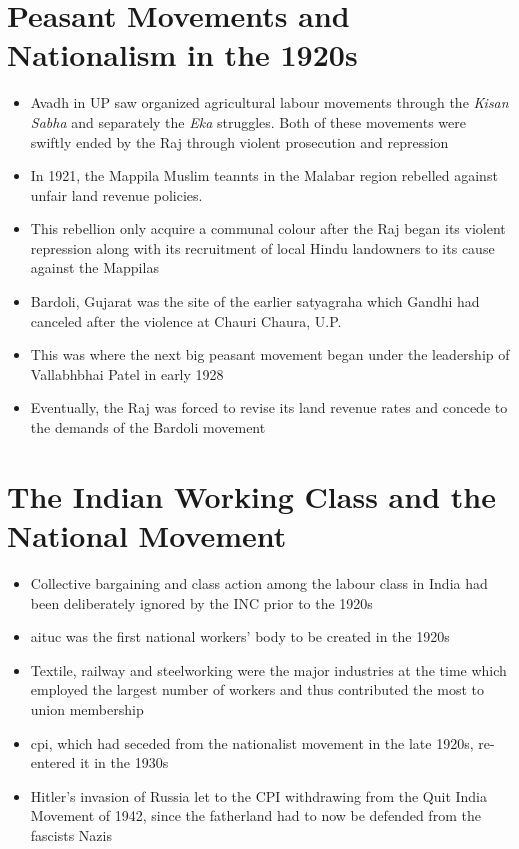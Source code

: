 \section{Peasant Movements and Nationalism in the 1920s}
\begin{itemize}
    \item Avadh in UP saw organized agricultural labour movements through the \textit{Kisan Sabha} and separately the \textit{Eka} struggles. Both of these movements were swiftly ended by the Raj through violent prosecution and repression
    \item In 1921, the Mappila Muslim teannts in the Malabar region rebelled against unfair land revenue policies.
    \item This rebellion only acquire a communal colour after the Raj began its violent repression along with its recruitment of local Hindu landowners to its cause against the Mappilas
    \item Bardoli, Gujarat was the site of the earlier satyagraha which Gandhi had canceled after the violence at Chauri Chaura, U.P.
    \item This was where the next big peasant movement began under the leadership of Vallabhbhai Patel in early 1928
    \item Eventually, the Raj was forced to revise its land revenue rates and concede to the demands of the Bardoli movement
\end{itemize}

\section{The Indian Working Class and the National Movement}
\begin{itemize}
    \item Collective bargaining and class action among the labour class in India had been deliberately ignored by the INC prior to the 1920s
    \item \gls{aituc} was the first national workers' body to be created in the 1920s
    \item Textile, railway and steelworking were the major industries at the time which employed the largest number of workers and thus contributed the most to union membership
    \item \gls{cpi}, which had seceded from the nationalist movement in the late 1920s, re-entered it in the 1930s
    \item Hitler's invasion of Russia let to the CPI withdrawing from the Quit India Movement of 1942, since the fatherland had to now be defended from the fascists Nazis
\end{itemize}

